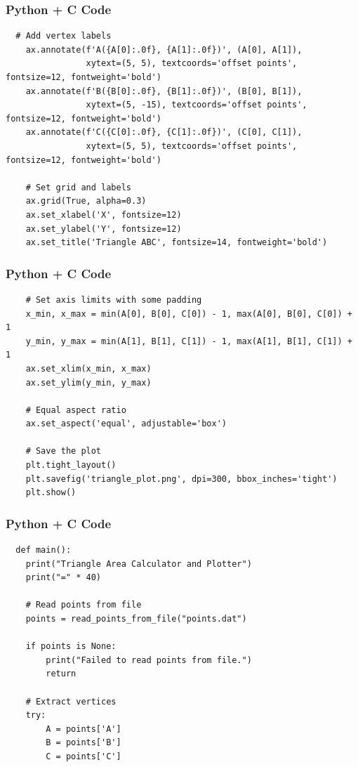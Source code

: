 \documentclass{beamer}
\begin{document}
\begin{frame}[fragile]
    \frametitle{Python + C Code}
    \begin{lstlisting}
  # Add vertex labels
    ax.annotate(f'A({A[0]:.0f}, {A[1]:.0f})', (A[0], A[1]), 
                xytext=(5, 5), textcoords='offset points', fontsize=12, fontweight='bold')
    ax.annotate(f'B({B[0]:.0f}, {B[1]:.0f})', (B[0], B[1]), 
                xytext=(5, -15), textcoords='offset points', fontsize=12, fontweight='bold')
    ax.annotate(f'C({C[0]:.0f}, {C[1]:.0f})', (C[0], C[1]), 
                xytext=(5, 5), textcoords='offset points', fontsize=12, fontweight='bold')
    
    # Set grid and labels
    ax.grid(True, alpha=0.3)
    ax.set_xlabel('X', fontsize=12)
    ax.set_ylabel('Y', fontsize=12)
    ax.set_title('Triangle ABC', fontsize=14, fontweight='bold')
    \end{lstlisting}
\end{frame}

\begin{frame}[fragile]
    \frametitle{Python + C Code}
    \begin{lstlisting}
    # Set axis limits with some padding
    x_min, x_max = min(A[0], B[0], C[0]) - 1, max(A[0], B[0], C[0]) + 1
    y_min, y_max = min(A[1], B[1], C[1]) - 1, max(A[1], B[1], C[1]) + 1
    ax.set_xlim(x_min, x_max)
    ax.set_ylim(y_min, y_max)
    
    # Equal aspect ratio
    ax.set_aspect('equal', adjustable='box')
    
    # Save the plot
    plt.tight_layout()
    plt.savefig('triangle_plot.png', dpi=300, bbox_inches='tight')
    plt.show()
    \end{lstlisting}
\end{frame}

\begin{frame}[fragile]
    \frametitle{Python + C Code}
    \begin{lstlisting}
  def main():
    print("Triangle Area Calculator and Plotter")
    print("=" * 40)
    
    # Read points from file
    points = read_points_from_file("points.dat")
    
    if points is None:
        print("Failed to read points from file.")
        return
    
    # Extract vertices
    try:
        A = points['A']
        B = points['B']
        C = points['C']
    \end{lstlisting}
\end{frame}
\end{document}

